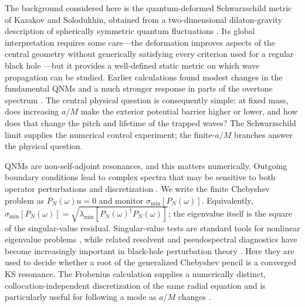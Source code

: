 \documentclass[12pt,a4paper]{article}
\begin{document}
The background considered here is the quantum-deformed Schwarzschild metric of
Kazakov and Solodukhin, obtained from a two-dimensional dilaton-gravity
description of spherically symmetric quantum fluctuations \cite{Kazakov1994}.
Its global interpretation requires some care---the deformation improves aspects
of the central geometry without generically satisfying every criterion used for
a regular black hole \cite{Berry2021}---but it provides a well-defined static
metric on which wave propagation can be studied. Earlier calculations found
modest changes in the fundamental QNMs and a much stronger response in parts of
the overtone spectrum \cite{Konoplya2020,Bolokhov2025}.  The central physical
question is consequently simple: at fixed mass, does increasing \(a/M\) make
the exterior potential barrier higher or lower, and how does that change the
pitch and lifetime of the trapped waves?  The Schwarzschild limit supplies the
numerical control experiment; the finite-\(a/M\) branches answer the physical
question.

QNMs are non-self-adjoint resonances, and this matters numerically. Outgoing
boundary conditions lead to complex spectra that may be sensitive to both
operator perturbations and discretization \cite{Jaramillo2021,Cao2024}. We
write the finite Chebyshev problem as \(P_N(\omega)u=0\) and monitor
\(\sigma_{\min}[P_N(\omega)]\). Equivalently,
\(\sigma_{\min}[P_N(\omega)]=
\sqrt{\lambda_{\min}[P_N(\omega)^\dagger P_N(\omega)]}\); the eigenvalue itself
is the square of the singular-value residual. Singular-value tests are standard tools
for nonlinear eigenvalue problems \cite{Sadkane2023}, while related resolvent
and pseudospectral diagnostics have become increasingly important in black-hole
perturbation theory \cite{Jaramillo2021,Cao2024}. Here they are used to decide
whether a root of the generalized Chebyshev pencil is a converged KS resonance.
The Frobenius calculation supplies a numerically distinct, collocation-independent discretization of the
same radial equation and is particularly useful for following a mode as
\(a/M\) changes \cite{Leaver1985,Bolokhov2025}.
\end{document}

